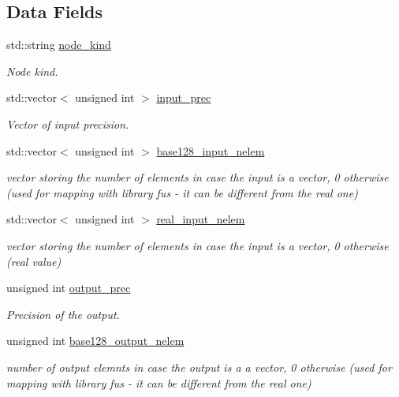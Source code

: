 \subsection*{Data Fields}
\begin{DoxyCompactItemize}
\item 
std\+::string \hyperlink{structnode__kind__prec__info_a14cf0117c5846e1a593aa9fd329496c0}{node\+\_\+kind}
\begin{DoxyCompactList}\small\item\em Node kind. \end{DoxyCompactList}\item 
std\+::vector$<$ unsigned int $>$ \hyperlink{structnode__kind__prec__info_a1edf8b5339f8ffe8cf6d205968c9fbb2}{input\+\_\+prec}
\begin{DoxyCompactList}\small\item\em Vector of input precision. \end{DoxyCompactList}\item 
std\+::vector$<$ unsigned int $>$ \hyperlink{structnode__kind__prec__info_a762c64140f1818d73e3a55bd1a3817bb}{base128\+\_\+input\+\_\+nelem}
\begin{DoxyCompactList}\small\item\em vector storing the number of elements in case the input is a vector, 0 otherwise (used for mapping with library fus -\/ it can be different from the real one) \end{DoxyCompactList}\item 
std\+::vector$<$ unsigned int $>$ \hyperlink{structnode__kind__prec__info_ad653f990cb9fc7c9a5f9b19fab554897}{real\+\_\+input\+\_\+nelem}
\begin{DoxyCompactList}\small\item\em vector storing the number of elements in case the input is a vector, 0 otherwise (real value) \end{DoxyCompactList}\item 
unsigned int \hyperlink{structnode__kind__prec__info_a080975025ea47c64fd2201007c4a2ecb}{output\+\_\+prec}
\begin{DoxyCompactList}\small\item\em Precision of the output. \end{DoxyCompactList}\item 
unsigned int \hyperlink{structnode__kind__prec__info_a7a28a8d398f231dc13bab0e19886f054}{base128\+\_\+output\+\_\+nelem}
\begin{DoxyCompactList}\small\item\em number of output elemnts in case the output is a a vector, 0 otherwise (used for mapping with library fus -\/ it can be different from the real one) \end{DoxyCompactList}\item 

\end{DoxyCompactItemize}
